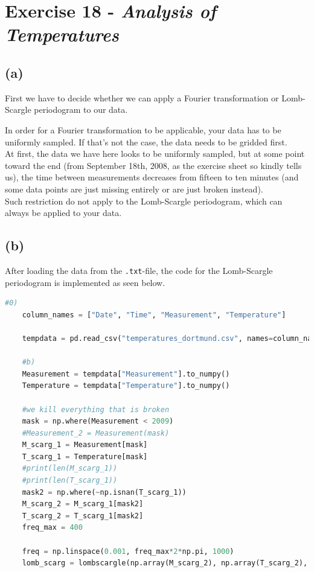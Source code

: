 \section*{Exercise 18 - \textit{Analysis of Temperatures}}

\subsection*{(a)}

First we have to decide whether we can apply a Fourier transformation or Lomb-Scargle periodogram to our data.

In order for a Fourier transformation to be applicable, your data has to be uniformly sampled. If that's not the case, the data needs to be gridded
first. \\

At first, the data we have here looks to be uniformly sampled, but at some point toward the end (from September 18th, 2008, as the exercise sheet so kindly tells us),
the time between measurements decreases from fifteen to ten minutes
(and some data points are just missing entirely or are just broken instead). \\

Such restriction do not apply to the Lomb-Scargle periodogram, which can always be applied to your data.

\subsection*{(b)}

After loading the data from the \texttt{.txt}-file, the code for the Lomb-Scargle periodogram is implemented as seen below.

\begin{lstlisting}[language = Python, caption={Implementation of the Lomb-Scagle periodogram.}, label = {list:lombscargle}]
    #0)
    column_names = ["Date", "Time", "Measurement", "Temperature"]
    
    tempdata = pd.read_csv("temperatures_dortmund.csv", names=column_names, sep=",", skiprows=1)
    
    #b)
    Measurement = tempdata["Measurement"].to_numpy()
    Temperature = tempdata["Temperature"].to_numpy()
    
    #we kill everything that is broken
    mask = np.where(Measurement < 2009)
    #Measurement_2 = Measurement(mask)
    M_scarg_1 = Measurement[mask] 
    T_scarg_1 = Temperature[mask]
    #print(len(M_scarg_1))
    #print(len(T_scarg_1))
    mask2 = np.where(~np.isnan(T_scarg_1))
    M_scarg_2 = M_scarg_1[mask2]
    T_scarg_2 = T_scarg_1[mask2]
    freq_max = 400
    
    freq = np.linspace(0.001, freq_max*2*np.pi, 1000) 
    lomb_scarg = lombscargle(np.array(M_scarg_2), np.array(T_scarg_2), freq, normalize=True)
    
\end{lstlisting}

